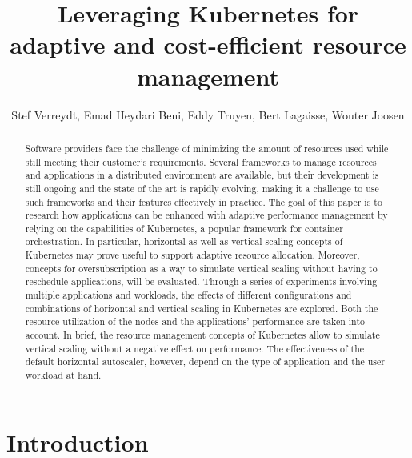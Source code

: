 \documentclass[sigplan,9pt]{acmart}
\begin{document}
\title{Leveraging Kubernetes for adaptive and cost-efficient resource management}

\author{Stef Verreydt, Emad Heydari Beni, Eddy Truyen, Bert Lagaisse, Wouter Joosen}
\renewcommand{\shortauthors}{S. Verreydt et al.}

\begin{abstract}
Software providers face the challenge of minimizing the amount of resources used while still meeting their customer's requirements. Several frameworks to manage resources and applications in a distributed environment are available, but their development is still ongoing and the state of the art is rapidly evolving, making it a challenge to use such frameworks and their features effectively in practice. The goal of this paper is to research how applications can be enhanced with adaptive performance management by relying on the capabilities of Kubernetes, a popular framework for container orchestration. In particular, horizontal as well as vertical scaling concepts of Kubernetes may prove useful to support adaptive resource allocation. Moreover, concepts for oversubscription as a way to simulate vertical scaling without having to reschedule applications, will be evaluated. Through a series of experiments involving multiple applications and workloads, the effects of different configurations and combinations of horizontal and vertical scaling in Kubernetes are explored. Both the resource utilization of the nodes and the applications' performance are taken into account. In brief, the resource management concepts of Kubernetes allow to simulate vertical scaling without a negative effect on performance. The effectiveness of the default horizontal autoscaler, however, depend on the type of application and the user workload at hand.
\end{abstract}

\maketitle


\section{Introduction}
\label{chap:introduction}


%
\end{document}

